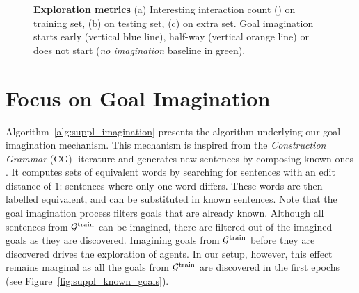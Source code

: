 \begin{figure*}[!h]
  \centering
  \caption{\textbf{Exploration metrics} (a) Interesting interaction count (\itwoc) on training set, (b) \itwoc on testing set, (c) \itwoc on extra set. Goal imagination starts early (vertical blue line), half-way (vertical orange line) or does not start (\textit{no imagination} baseline in green).}
  \label{fig:explo_metrics}
\end{figure*}   


\clearpage

\section{Focus on Goal Imagination}
\label{sec:suppl_goal_imagination}

Algorithm~\ref{alg:suppl_imagination} presents the algorithm underlying our goal imagination mechanism. This mechanism is inspired from the \textit{Construction Grammar} (CG) literature and generates new sentences by composing known ones \cite{goldberg2003constructions}. It computes sets of equivalent words by searching for sentences with an edit distance of $1$: sentences where only one word differs. These words are then labelled equivalent, and can be substituted in known sentences. Note that the goal imagination process filters goals that are already known. Although all sentences from $\mathcal{G}^{\text{train}}$ can be imagined, there are filtered out of the imagined goals as they are discovered. Imagining goals from $\mathcal{G}^{\text{train}}$ before they are discovered drives the exploration of \imagine agents. In our setup, however, this effect remains marginal as all the goals from $\mathcal{G}^{\text{train}}$ are discovered in the first epochs (see Figure~\ref{fig:suppl_known_goals}). 


